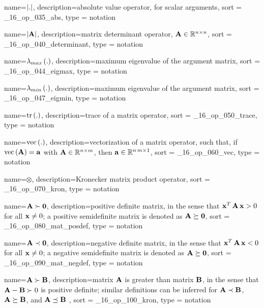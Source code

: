 {
  name={\ensuremath{\abs{.}}},
  description={absolute value operator, for scalar arguments},
  sort = _16_op_035_abs,
  type = notation
}

{
  name={\ensuremath{\determ{\mat{A}}}},
  description={matrix determinant operator, $\mathbf{A} \in \mathbb{R}^{n\times n}$},
  sort = _16_op_040_determinant,
  type = notation
}

{
  name={\ensuremath{\eigmax{.}}},
  description={maximum eigenvalue of the argument matrix},
  sort = _16_op_044_eigmax,
  type = notation
}

{
  name={\ensuremath{\eigmin{.}}},
  description={maximum eigenvalue of the argument matrix},
  sort = _16_op_047_eigmin,
  type = notation
}

{
  name={\ensuremath{\tr{.}}},
  description={trace of a matrix operator},
  sort = _16_op_050_trace,
  type = notation
}

{
  name={\ensuremath{\vc{.}}},
  description={vectorization of a matrix operator, such that, 
  if ${\rm vec}\left(\mathbf{A}\right) = \mathbf{a}$ with $\mathbf{A} \in \mathbb{R}^{n\times m}$, then $\mathbf{a} \in \mathbb{R}^{n\,m\times 1}$},
  sort = _16_op_060_vec,
  type = notation
}

{
  name={\ensuremath{\otimes}},
  description={Kronecker matrix product operator},
  sort = _16_op_070_kron,
  type = notation
}

{
  name={\ensuremath{ \mat{A} \succ \zero }},
  description={positive definite matrix, in the sense that 
                $\mathbf{x}^T\,\mathbf{A}\,\mathbf{x} > 0$ for all $\mathbf{x} \neq 0$; 
                a positive semidefinite matrix is denoted as $\mathbf{A} \succeq \mathbf{0}$},
  sort = _16_op_080_mat_posdef,
  type = notation
}

{
  name={\ensuremath{ \mat{A} \prec \zero }},
  description={negative definite matrix, in the sense that 
                $\mathbf{x}^T\,\mathbf{A}\,\mathbf{x} < 0$ for all $\mathbf{x} \neq 0$; 
                a negative semidefinite matrix is denoted as $\mathbf{A} \succeq \mathbf{0}$},
  sort = _16_op_090_mat_negdef,
  type = notation
}

{
  name={\ensuremath{\mat{A} \succ \mat{B} }},
  description={matrix $\mathbf{A}$ is greater than matrix $\mathbf{B}$, in the sense 
                that $\mathbf{A} - \mathbf{B} \succ 0$ is positive definite; 
                similar definitions can be inferred for $\mathbf{A} \prec \mathbf{B}$,
                $\mathbf{A} \succeq \mathbf{B}$, and $\mathbf{A} \preceq \mathbf{B}$ },
  sort = _16_op_100_kron,
  type = notation
}

